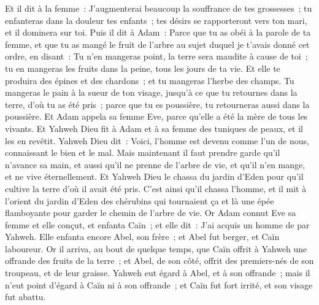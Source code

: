 \begin{multicols}{2}
Et il dit à la femme~: J'augmenterai beaucoup la souffrance de tes grossesses~; tu enfanteras dans la douleur tes enfants~; tes désirs se rapporteront vers ton mari, et il dominera sur toi.
Puis il dit à Adam~: Parce que tu as obéi à la parole de ta femme, et que tu as mangé le fruit de l'arbre au sujet duquel je t'avais donné cet ordre, en disant~: Tu n'en mangeras point, la terre sera maudite à cause de toi~; tu en mangeras les fruits dans la peine, tous les jours de ta vie.
Et elle te produira des épines et des chardons~; et tu mangeras l'herbe des champs.
Tu mangeras le pain à la sueur de ton visage, jusqu'à ce que tu retournes dans la terre, d'où tu as été pris~; parce que tu es poussière, tu retourneras aussi dans la poussière. 
Et Adam appela sa femme Eve, parce qu'elle a été la mère de tous les vivants.
Et Yahweh Dieu fit à Adam et à sa femme des tuniques de peaux, et il les en revêtit.
Yahweh Dieu dit~: Voici, l'homme est devenu comme l'un de nous, connaissant le bien et le mal. Mais maintenant il faut prendre garde qu'il n'avance sa main, et aussi qu'il ne prenne de l'arbre de vie, et qu'il n'en mange, et ne vive éternellement.
Et Yahweh Dieu le chassa du jardin d'Eden pour qu'il cultive la terre d'où il avait été pris.
C'est ainsi qu'il chassa l'homme, et il mit à l'orient du jardin d'Eden des chérubins qui tournaient ça et là une épée flamboyante pour garder le chemin de l'arbre de vie.
\VerseOne{}Or Adam connut Eve sa femme et elle conçut, et enfanta Caïn~; et elle dit~: J'ai acquis un homme de par Yahweh.
Elle enfanta encore Abel, son frère~; et Abel fut berger, et Caïn laboureur.
Or il arriva, au bout de quelque temps, que Caïn offrit à Yahweh une offrande des fruits de la terre~;
et Abel, de son côté, offrit des premiers-nés de son troupeau, et de leur graisse. Yahweh eut égard à Abel, et à son offrande~;
mais il n'eut point d'égard à Caïn ni à son offrande~; et Caïn fut fort irrité, et son visage fut abattu.

\end{multicols}
